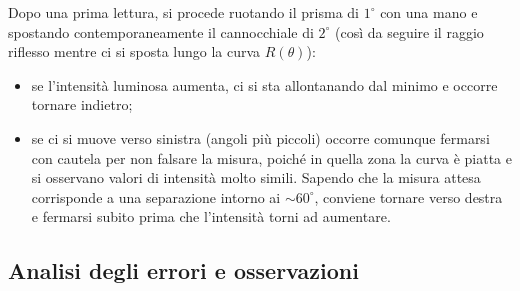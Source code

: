 \documentclass[openany,a4paper,12pt]{book}
\begin{document}
Dopo una prima lettura, si procede ruotando il prisma di $1^\circ$ con una mano e spostando contemporaneamente il cannocchiale di $2^\circ$ (così da seguire il raggio riflesso mentre ci si sposta lungo la curva $R(\theta)$):
\begin{itemize}
    \item se l'intensità luminosa aumenta, ci si sta allontanando dal minimo e occorre tornare indietro;
    \item se ci si muove verso sinistra (angoli più piccoli) occorre comunque fermarsi con cautela per non falsare la misura, poiché in quella zona la curva è piatta e si osservano valori di intensità molto simili. Sapendo che la misura attesa corrisponde a una separazione intorno ai $\sim 60^\circ$, conviene tornare verso destra e fermarsi subito prima che l'intensità torni ad aumentare.
\end{itemize}

\subsection*{Analisi degli errori e osservazioni}
\end{document}
